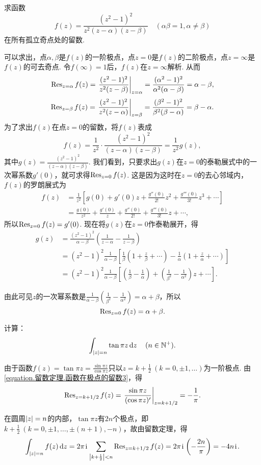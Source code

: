 \begin{example}
求函数\[
f(z) = \frac{(z^2-1)^2}{z^2(z-\alpha)(z-\beta)}
\quad(\alpha\beta=1, \alpha\neq\beta)
\]在所有孤立奇点处的留数.
\begin{solution}
可以求出，点\(\alpha,\beta\)是\(f(z)\)的一阶极点，点\(z=0\)是\(f(z)\)的二阶极点，点\(z=\infty\)是\(f(z)\)的可去奇点.
令\(f(\infty)=1\)后，\(f(z)\)在\(z=\infty\)解析.
从而\[
\Res_{z=\alpha} f(z)
= \eval{ \frac{(z^2-1)^2}{z^2(z-\beta)} }_{z=\alpha}
= \frac{(\alpha^2-1)^2}{\alpha^2(\alpha-\beta)}
= \alpha-\beta,
\]\[
\Res_{z=\beta} f(z)
= \eval{ \frac{(z^2-1)^2}{z^2(z-\alpha)} }_{z=\beta}
= \frac{(\beta^2-1)^2}{\beta^2(\beta-\alpha)}
= \beta-\alpha.
\]为了求出\(f(z)\)在点\(z=0\)的留数，将\(f(z)\)表成\[
f(z) = \frac{1}{z^2} \cdot \frac{(z^2-1)^2}{(z-\alpha)(z-\beta)}
= \frac{1}{z^2} g(z),
\]其中\(g(z) = \frac{(z^2-1)^2}{(z-\alpha)(z-\beta)}\).
我们看到，只要求出\(g(z)\)在\(z=0\)的泰勒展式中的一次幂系数\(g'(0)\)，就可求得\(\operatorname{Res}_{z=0} f(z)\).
这是因为这时在\(z=0\)的去心邻域内，\(f(z)\)的罗朗展式为\begin{align*}
f(z) &= \frac{1}{z^2} \left[ g(0) + g'(0) z + \frac{g''(0)}{2!} z^2 + \frac{g'''(0)}{3!} z^3 + \dotsb \right] \\
&= \frac{g(0)}{z^2} + \frac{g'(0)}{z} + \frac{g''(0)}{2!} + \frac{g'''(0)}{3!} z + \dotsb,
\end{align*}
所以\(\operatorname{Res}_{z=0} f(z) = g'(0)\).
现在将\(g(z)\)在\(z=0\)作泰勒展开，得\begin{align*}
g(z) &= \frac{(z^2-1)^2}{\alpha-\beta} \left(\frac{1}{z-\alpha}-\frac{1}{z-\beta}\right) \\
&= (z^2-1)^2 \frac{1}{\alpha-\beta} \left[
\frac{1}{\beta} \left(1+\frac{z}{\beta}+\dotsb\right)
- \frac{1}{\alpha} \left(1+\frac{z}{\alpha}+\dotsb\right)
\right] \\
&= (z^2-1)^2 \frac{1}{\alpha-\beta} \left[
\left(\frac{1}{\beta}-\frac{1}{\alpha}\right)
+ \left(\frac{1}{\beta^2}-\frac{1}{\alpha^2}\right) z
+ \dotsb
\right].
\end{align*}

由此可见\(z\)的一次幂系数是\(\frac{1}{\alpha-\beta} \left(\frac{1}{\beta^2}-\frac{1}{\alpha^2}\right) = \alpha+\beta\)，所以\[
\operatorname{Res}_{z=0} f(z) = \alpha+\beta.
\]
\end{solution}
\end{example}

\begin{example}
计算：\[
\int_{\abs{z}=n} \tan \pi z \dd{z}
\quad(n\in\mathbb{N}^+).
\]
\begin{solution}
由于函数\(f(z) = \tan \pi z = \frac{\sin \pi z}{\cos \pi z}\)只以\(z=k+\frac{1}{2}\ (k=0,\pm1,\dotsc)\)为一阶极点.
由\cref{equation.留数定理.函数在极点的留数3}，得\[
\Res_{z=k+1/2} f(z)
= \eval{\frac{\sin \pi z}{(\cos \pi z)'}}_{z=k+1/2}
= -\frac{1}{\pi}.
\]

在圆周\(\abs{z}=n\)的内部，\(\tan \pi z\)有\(2n\)个极点，即\(k + \frac{1}{2}\ (k=0,\pm1,\dotsc,\pm(n+1),-n)\)，故由留数定理，得\[
\int_{\abs{z}=n} f(z) \dd{z}
= 2\pi\kern1pt\mathrm{i}\kern1pt \sum\limits_{\abs{k+\frac{1}{2}}<n} \operatorname{Res}_{z=k+1/2} f(z)
= 2\pi\kern1pt\mathrm{i}\kern1pt \left(-\frac{2n}{\pi}\right)
= -4n\kern1pt\mathrm{i}\kern1pt.
\]
\end{solution}
\end{example}

